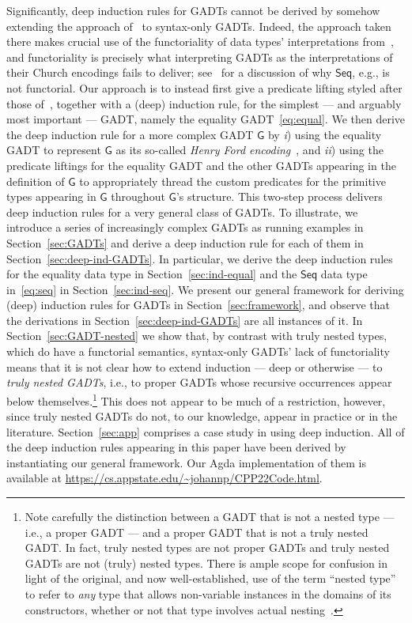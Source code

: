 \documentclass[sigplan,screen]{acmart}
\begin{document}
Significantly, deep induction rules for GADTs cannot be derived by
somehow extending the approach of~\cite{jp20} to syntax-only
GADTs. Indeed, the approach taken there makes crucial use of the
functoriality of data types' interpretations from~\cite{jp19}, and
functoriality is precisely what interpreting GADTs as the
interpretations of their Church encodings fails to deliver;
see~\cite{jg08} for a discussion of why $\mathsf{Seq}$, e.g., is not
functorial. Our approach is to instead first give a predicate lifting
styled after those of~\cite{jp20}, together with a (deep) induction
rule, for the simplest --- and arguably most important --- GADT,
namely the equality GADT~\eqref{eq:equal}. We then derive the deep
induction rule for a more complex GADT $\mathsf{G}$ by {\em i}) using
the equality GADT to represent $\mathsf{G}$ as its so-called {\em
  Henry Ford encoding}~\cite{ch03,hin03,mcb99,sjsv09,sp04}, and {\em
  ii}) using the predicate liftings for the equality GADT and the
other GADTs appearing in the definition of $\mathsf{G}$ to
appropriately thread the custom predicates for the primitive types
appearing in $\mathsf{G}$ throughout $\mathsf{G}$'s structure. This
two-step process delivers deep induction rules for a very general
class of GADTs. To illustrate, we introduce a series of increasingly
complex GADTs as running examples in Section~\ref{sec:GADTs} and
derive a deep induction rule for each of them in
Section~\ref{sec:deep-ind-GADTs}. In particular, we derive the deep
induction rules for the equality data type in
Section~\ref{sec:ind-equal} and the $\mathsf{Seq}$ data type
in~\eqref{eq:seq} in Section~\ref{sec:ind-seq}. We present our general
framework for deriving (deep) induction rules for GADTs in
Section~\ref{sec:framework}, and observe that the derivations in
Section~\ref{sec:deep-ind-GADTs} are all instances of it.  In
Section~\ref{sec:GADT-nested} we show that, by contrast with truly
nested types, which do have a functorial semantics, syntax-only GADTs'
lack of functoriality means that it is not clear how to extend
induction --- deep or otherwise --- to {\em truly nested GADTs}, i.e.,
to proper GADTs whose recursive occurrences appear below
themselves.\footnote{Note carefully the distinction between a GADT
  that is not a nested type --- i.e., a proper GADT --- and a proper
  GADT that is not a truly nested GADT.  In fact, truly nested types
  are not proper GADTs and truly nested GADTs are not (truly) nested
  types. There is ample scope for confusion in light of the original,
  and now well-established, use of the term ``nested type'' to refer
  to {\em any} type that allows non-variable instances in the domains
  of its constructors, whether or not that type involves actual
  nesting~\cite{bm98}.}  This does not appear to be much of a
restriction, however, since truly nested GADTs do not, to our
knowledge, appear in practice or in the
literature. Section~\ref{sec:app} comprises a case study in using deep
induction. All of the deep induction rules appearing in this paper
have been derived by instantiating our general framework. Our Agda
implementation of them is available at
\url{https://cs.appstate.edu/~johannp/CPP22Code.html}.
\end{document}
